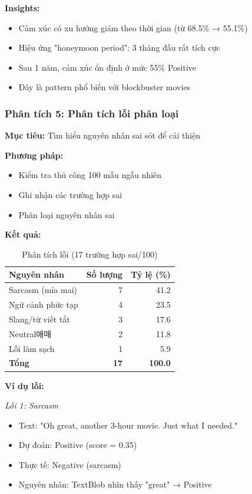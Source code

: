 \textbf{Insights:}
\begin{itemize}
    \item Cảm xúc có xu hướng giảm theo thời gian (từ 68.5\% → 55.1\%)
    \item Hiệu ứng "honeymoon period": 3 tháng đầu rất tích cực
    \item Sau 1 năm, cảm xúc ổn định ở mức 55\% Positive
    \item Đây là pattern phổ biến với blockbuster movies
\end{itemize}

\subsubsection{Phân tích 5: Phân tích lỗi phân loại}

\textbf{Mục tiêu:} Tìm hiểu nguyên nhân sai sót để cải thiện

\textbf{Phương pháp:}
\begin{itemize}
    \item Kiểm tra thủ công 100 mẫu ngẫu nhiên
    \item Ghi nhận các trường hợp sai
    \item Phân loại nguyên nhân sai
\end{itemize}

\textbf{Kết quả:}
\begin{table}[H]
\centering
\caption{Phân tích lỗi (17 trường hợp sai/100)}
\begin{tabular}{|l|r|r|}
\hline
\textbf{Nguyên nhân} & \textbf{Số lượng} & \textbf{Tỷ lệ (\%)} \\
\hline
Sarcasm (mỉa mai) & 7 & 41.2 \\
\hline
Ngữ cảnh phức tạp & 4 & 23.5 \\
\hline
Slang/từ viết tắt & 3 & 17.6 \\
\hline
Neutral애매 & 2 & 11.8 \\
\hline
Lỗi làm sạch & 1 & 5.9 \\
\hline
\textbf{Tổng} & \textbf{17} & \textbf{100.0} \\
\hline
\end{tabular}
\end{table}

\textbf{Ví dụ lỗi:}

\textit{Lỗi 1: Sarcasm}
\begin{itemize}
    \item Text: "Oh great, another 3-hour movie. Just what I needed."
    \item Dự đoán: Positive (score = 0.35)
    \item Thực tế: Negative (sarcasm)
    \item Nguyên nhân: TextBlob nhìn thấy "great" → Positive
\end{itemize}

